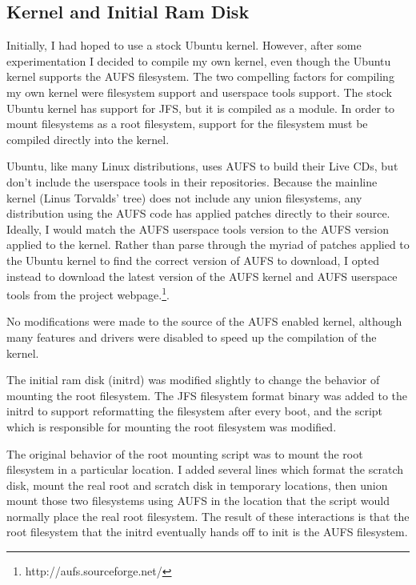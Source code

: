 \documentclass[12pt]{article}
\begin{document}
\subsection{Kernel and Initial Ram Disk}

Initially, I had hoped to use a stock Ubuntu kernel.  However, after some
experimentation I decided to compile my own kernel, even though the Ubuntu
kernel supports the AUFS filesystem.  The two compelling factors for compiling
my own kernel were filesystem support and userspace tools support.  The stock
Ubuntu kernel has support for JFS, but it is compiled as a module.  In order to
mount filesystems as a root filesystem, support for the filesystem must be
compiled directly into the kernel.

Ubuntu, like many Linux distributions, uses AUFS to build their Live CDs, but
don't include the userspace tools in their repositories.  Because the mainline
kernel (Linus Torvalds' tree) does not include any union filesystems, any
distribution using the AUFS code has applied patches directly to their source.
Ideally, I would match the AUFS userspace tools version to the AUFS version
applied to the kernel.  Rather than parse through the myriad of patches applied
to the Ubuntu kernel to find the correct version of AUFS to download, I opted
instead to download the latest version of the AUFS kernel and AUFS userspace
tools from the project webpage.\footnote{http://aufs.sourceforge.net/}.  

No modifications were made to the source of the AUFS enabled kernel, although
many features and drivers were disabled to speed up the compilation of the 
kernel.  

The initial ram disk (initrd) was modified slightly to change the behavior of mounting
the root filesystem.  The JFS filesystem format binary was added to the 
initrd to support reformatting the filesystem after every boot, and the 
script which is responsible for mounting the root filesystem was modified.

The original behavior of the root mounting script was to mount the root
filesystem in a particular location.  I added several lines which format the
scratch disk, mount the real root and scratch disk in temporary locations, then
union mount those two filesystems using AUFS in the location that the script
would normally place the real root filesystem.  The result of these
interactions is that the root filesystem that the initrd eventually hands off
to init is the AUFS filesystem.

\end{document}
